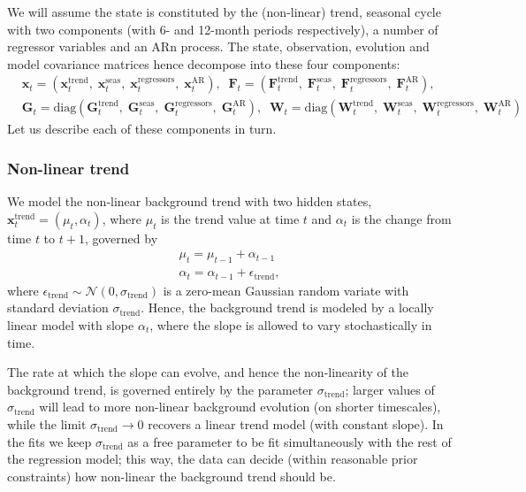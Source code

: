 \documentclass[a4paper, oneside, final]{scrartcl}
\begin{document}
We will assume the state is constituted by the (non-linear) trend, seasonal cycle with two components (with 6- and 12-month periods respectively), a number of regressor variables and an ARn process. The state, observation, evolution and model covariance matrices hence decompose into these four components:
\begin{align}
&\mathbf{x}_t = \left(\mathbf{x}^\mathrm{trend}_t,\; \mathbf{x}^\mathrm{seas}_t, \;\mathbf{x}^\mathrm{regressors}_t, \;\mathbf{x}^\mathrm{AR}_t\right),\;\;\mathbf{F}_t = \left(\mathbf{F}^\mathrm{trend}_t,\; \mathbf{F}^\mathrm{seas}_t, \;\mathbf{F}^\mathrm{regressors}_t, \;\mathbf{F}^\mathrm{AR}_t\right), \nonumber \\
&\mathbf{G}_t = \mathrm{diag}\left(\mathbf{G}^\mathrm{trend}_t, \;\mathbf{G}^\mathrm{seas}_t, \;\mathbf{G}^\mathrm{regressors}_t, \;\mathbf{G}^\mathrm{AR}_t\right),\;\;\mathbf{W}_t = \mathrm{diag}\left(\mathbf{W}^\mathrm{trend}_t,\; \mathbf{W}^\mathrm{seas}_t,\; \mathbf{W}^\mathrm{regressors}_t,\; \mathbf{W}^\mathrm{AR}_t\right)
\end{align}
Let us describe each of these components in turn.
%
\subsubsection*{Non-linear trend}
%
We model the non-linear background trend with two hidden states, $\mathbf{x}^\mathrm{trend}_t=\left(\mu_t, \alpha_t\right)$, where $\mu_t$ is the trend value at time $t$ and $\alpha_t$ is the change from time $t$ to $t+1$, governed by
\begin{align}
\label{trend}
\mu_t = \mu_{t-1} + \alpha_{t-1} \nonumber \\
\alpha_t = \alpha_{t-1} + \epsilon_\mathrm{trend},
\end{align}
where $\epsilon_\mathrm{trend}\sim \mathcal{N}(0, \sigma_\mathrm{trend})$ is a zero-mean Gaussian random variate with standard deviation $\sigma_\mathrm{trend}$. Hence, the background trend is modeled by a locally linear model with slope $\alpha_t$, where the slope is allowed to vary stochastically in time. 

The rate at which the slope can evolve, and hence the non-linearity of the background trend, is governed entirely by the parameter $\sigma_\mathrm{trend}$; larger values of $\sigma_\mathrm{trend}$ will lead to more non-linear background evolution (on shorter timescales), while the limit $\sigma_\mathrm{trend}\rightarrow 0$ recovers a linear trend model (with constant slope). In the fits we keep $\sigma_\mathrm{trend}$ as a free parameter to be fit simultaneously with the rest of the regression model; this way, the data can decide (within reasonable prior constraints) how non-linear the background trend should be.
\end{document}
